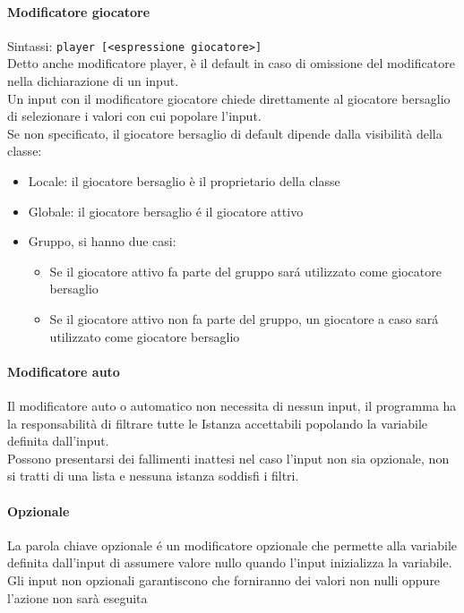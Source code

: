 \paragraph{Modificatore giocatore}
Sintassi: \lstinline|player [<espressione giocatore>]| \\
Detto anche modificatore player, è il default in caso di omissione del modificatore nella
dichiarazione di un input. \\
Un input con il modificatore giocatore chiede direttamente al giocatore bersaglio di 
selezionare i valori con cui popolare l'input. \\
Se non specificato, il giocatore bersaglio di default dipende dalla visibilità della classe:
\begin{itemize}
    \item Locale: il giocatore bersaglio è il proprietario della classe
    \item Globale: il giocatore bersaglio é il giocatore attivo 
    \item {
        Gruppo, si hanno due casi:
        \begin{itemize}
            \item Se il giocatore attivo fa parte del gruppo sará utilizzato come giocatore bersaglio
            \item Se il giocatore attivo non fa parte del gruppo, un giocatore a caso sará utilizzato come giocatore bersaglio
        \end{itemize}
    }
\end{itemize}

\paragraph{Modificatore auto}
Il modificatore auto o automatico non necessita di nessun input, il programma ha la responsabilità di
filtrare tutte le Istanza accettabili popolando la variabile definita dall'input. \\
Possono presentarsi dei fallimenti inattesi nel caso l'input non sia opzionale,
non si tratti di una lista e nessuna istanza soddisfi i filtri.

\paragraph{Opzionale}
La parola chiave opzionale é un modificatore opzionale che permette alla variabile definita dall'input
di assumere valore nullo quando l'input inizializza la variabile. \\ 
Gli input non opzionali garantiscono che forniranno dei valori non nulli oppure l'azione non sarà eseguita

